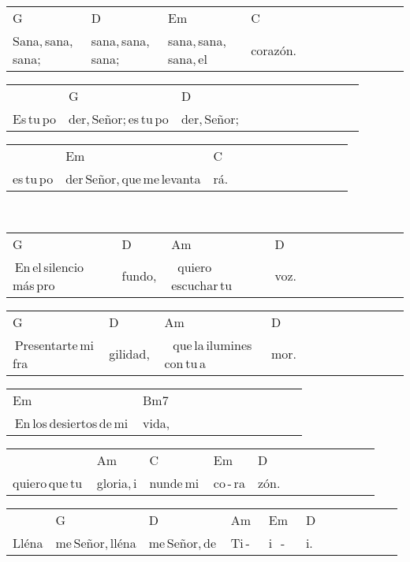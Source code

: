 \begin{multicols}{2}
\noindent
\begin{minipage}{\columnwidth}
\noindent
\noindent
\begin{tabular}{llllllllllll}
G&D&Em&C\\
Sana,\,sana,\,sana;\,&sana,\,sana,\,sana;\,&sana,\,sana,\,sana,\,el\,&corazón.
\end{tabular}

\noindent
\begin{tabular}{llllllllllll}
&G&D\\
Es\,tu\,po&der,\,Señor;\,es\,tu\,po&der,\,Señor;
\end{tabular}

\noindent
\begin{tabular}{llllllllllll}
&Em&C\\
es\,tu\,po&der\,Señor,\,que\,me\,levanta&rá.
\end{tabular}
\end{minipage}\\

\noindent
\begin{minipage}{\columnwidth}
\noindent
\noindent
\begin{tabular}{llllllllllll}
G&D&Am&D\\
\quad\,En\,el\,silencio\,más\,pro&fundo,\,&\,\,\,quiero\,escuchar\,tu\,&voz.
\end{tabular}

\noindent
\begin{tabular}{llllllllllll}
G&D&Am&D\\
\quad\,Presentarte\,mi\,fra&gilidad,\,&\,\,\,\,que\,la\,ilumines\,con\,tu\,a&mor.
\end{tabular}

\noindent
\begin{tabular}{llllllllllll}
Em&Bm7\\
\quad\,En\,los\,desiertos\,de\,mi\,&vida,
\end{tabular}

\noindent
\begin{tabular}{llllllllllll}
&Am&C&Em&D\\
quiero\,que\,tu\,&gloria,\,i&nunde\,mi\,&co\,-\,ra&zón.
\end{tabular}

\noindent
\begin{tabular}{llllllllllll}
&G&D&Am&Em&D\\
Lléna&me\,Señor,\,lléna&me\,Señor,\,de\,&Ti\,-\,\,\,&i\,\,\,\,-\,\,\,\,&i.
\end{tabular}


\end{minipage}
\end{multicols}
